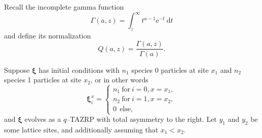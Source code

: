 \documentclass{ximera}
\begin{document}
Recall the incomplete gamma function $$\Gamma(a,z) =\int_{z}^{\infty} t^{a-1} \mathrm{e}^{-t} \mathrm{~d} t
$$
and define its normalization 
$$
Q(a, z)=\frac{\Gamma(a, z)}{\Gamma(a)} .
$$

\begin{theorem}\label{Application}
Suppose $\boldsymbol\xi$ has initial conditions with $n_1$ species 0 particles at site $x_1$ and $n_2$ species 1  particles at site $x_2$, or in other words 
$$
\boldsymbol\xi_i^x 
= 
\begin{cases}
n_1 \ \text{for} \  i=0,x=x_1,\\
n_2 \ \text{for} \  i=1,x=x_2,\\
0 \ \  \text{else},
\end{cases}
$$  
and $\boldsymbol\xi$ evolves as a $q$--TAZRP with total asymmetry to the right. Let $y_1$ and $y_2$ be some lattice sites, and additionally assuming that $x_1<x_2$. 
 


\end{theorem}
\end{document}
